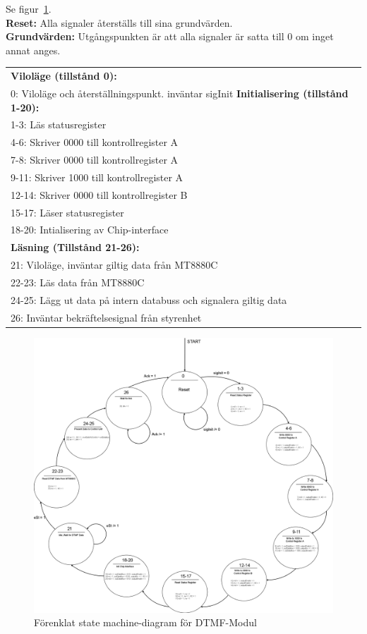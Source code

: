 \documentclass[a4paper,11pt]{article}
\begin{document}
			Se figur~\ref{fig:DTMFSM}.\\
			{\bf Reset:} Alla signaler återställs till sina grundvärden.\\
			{\bf Grundvärden:} Utgångspunkten är att alla signaler är satta till 0 om inget annat anges.\\
			\begin{tabular}{l}
				\\{\bf Viloläge (tillstånd 0):}\\
				0: Viloläge och återställningspunkt. inväntar sigInit
				{\bf Initialisering (tillstånd 1-20):}\\
				1-3: Läs statusregister\\
				4-6: Skriver 0000 till kontrollregister A\\
				7-8: Skriver 0000 till kontrollregister A\\
				9-11: Skriver 1000 till kontrollregister A\\
				12-14: Skriver 0000 till kontrollregister B\\
				15-17: Läser statusregister\\
				18-20: Intialisering av Chip-interface\\
				{\bf Läsning (Tillstånd 21-26):}\\
				21:  Viloläge, inväntar giltig data från MT8880C\\
				22-23:  Läs data från MT8880C\\
				24-25:  Lägg ut data på intern databuss och signalera giltig data\\
				26:  Inväntar bekräftelsesignal från styrenhet\\				
			\end{tabular}

	\begin{figure}[H]
	  \centering
	      \includegraphics[scale=0.18, angle=0]{DTMFStateMachineDiagram.png}		
	  	\caption{Förenklat state machine-diagram för DTMF-Modul}
		\label{fig:DTMFSM}
	\end{figure}
	
\end{document}
